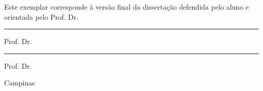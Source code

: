 \begin{center}
    \begin{minipage}[c]{0.8\textwidth}
        {\large
        Este exemplar corresponde \`a vers\~ao final da 
        disserta\c c\~ao %
        defendida pelo aluno \autor e orientada pelo Prof. Dr. \orientador
        }
    \end{minipage}
\end{center}

\vspace{1cm}

\begin{center}
    \begin{minipage}[c]{8.5cm}
        \begin{center}
            {\sc
            \rule[1pt]{8.5cm}{.5pt} %

            Prof. Dr. \orientador
            }
        \end{center}
    \end{minipage}
    \hspace{.5cm}
    \begin{minipage}[c]{8.5cm}
        \begin{center}
            {\sc
            \rule[1pt]{8.5cm}{.5pt} %

            Prof. Dr. \coorientador
            }
        \end{center}
    \end{minipage}
\end{center}

\vspace{1cm}

\begin{center}
    {\Large {\sc Campinas \\ \ano} }
\end{center}
